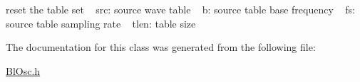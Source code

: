 reset the table set ~\newline
src\+: source wave table ~\newline
b\+: source table base frequency ~\newline
fs\+: source table sampling rate ~\newline
tlen\+: table size 

The documentation for this class was generated from the following file\+:\begin{DoxyCompactItemize}
\item 
\hyperlink{_bl_osc_8h}{Bl\+Osc.\+h}\end{DoxyCompactItemize}
